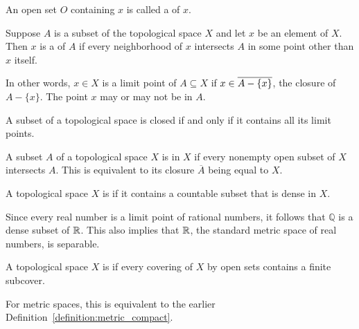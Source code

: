 \begin{definition}
An open set $O$ containing $x$ is called a  of $x$.
\end{definition}

\begin{definition}
Suppose $A$ is a subset of the topological space $X$ and let $x$ be an element of $X$.
Then $x$ is a  of $A$ if every neighborhood of $x$ intersects $A$ in some point other than $x$ itself.
\end{definition}

In other words, $x \in X$ is a limit point of $A \subseteq X$ if $x \in \overline{A - \{ x \}}$, the closure of $A - \{ x \}$.
The point $x$ may or may not be in $A$.

\begin{theorem}
A subset of a topological space is closed if and only if it contains all its limit points.
\end{theorem}

\begin{definition}
A subset $A$ of a topological space $X$ is  in $X$ if every nonempty open subset of $X$ intersects $A$.
This is equivalent to its closure $\overline{A}$ being equal to $X$.
\end{definition}

\begin{definition}
A topological space $X$ is  if it contains a countable subset that is dense in $X$.
\end{definition}

\begin{example}
Since every real number is a limit point of rational numbers, it follows that $\mathbb{Q}$ is a dense subset of $\mathbb{R}$.
This also implies that $\mathbb{R}$, the standard metric space of real numbers, is separable.
\end{example}

\begin{definition} \label{definition:topology_compact}
A topological space $X$ is  if every covering of $X$ by open sets contains a finite subcover.
\end{definition}

\begin{remark}
For metric spaces, this is equivalent to the earlier Definition~\ref{definition:metric_compact}.
\end{remark}

